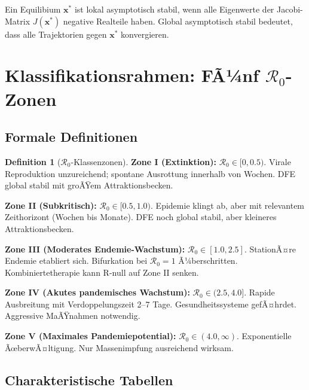 ﻿\documentclass[a4paper,12pt,twoside]{article}
\theoremstyle{definition}
\newtheorem{definition}{Definition}[section]
\begin{document}
Ein Equilibium $\mathbf{x}^*$ ist lokal asymptotisch stabil, wenn alle Eigenwerte der Jacobi-Matrix $J(\mathbf{x}^*)$ negative Realteile haben. Global asymptotisch stabil bedeutet, dass alle Trajektorien gegen $\mathbf{x}^*$ konvergieren.

\section{Klassifikationsrahmen: FÃ¼nf $\mathcal{R}_0$-Zonen}
\label{sec:classification}

\subsection{Formale Definitionen}

\begin{definition}[$\mathcal{R}_0$-Klassenzonen]

\textbf{Zone I (Extinktion):} $\mathcal{R}_0 \in [0, 0.5)$. Virale Reproduktion unzureichend; spontane Ausrottung innerhalb von Wochen. DFE global stabil mit groÃŸem Attraktionsbecken.

\textbf{Zone II (Subkritisch):} $\mathcal{R}_0 \in [0.5, 1.0)$. Epidemie klingt ab, aber mit relevantem Zeithorizont (Wochen bis Monate). DFE noch global stabil, aber kleineres Attraktionsbecken.

\textbf{Zone III (Moderates Endemie-Wachstum):} $\mathcal{R}_0 \in [1.0, 2.5]$. StationÃ¤re Endemie etabliert sich. Bifurkation bei $\mathcal{R}_0 = 1$ Ã¼berschritten. Kombiniertetherapie kann R-null auf Zone II senken.

\textbf{Zone IV (Akutes pandemisches Wachstum):} $\mathcal{R}_0 \in (2.5, 4.0]$. Rapide Ausbreitung mit Verdoppelungszeit 2--7 Tage. Gesundheitssysteme gefÃ¤hrdet. Aggressive MaÃŸnahmen notwendig.

\textbf{Zone V (Maximales Pandemiepotential):} $\mathcal{R}_0 \in (4.0, \infty)$. Exponentielle ÃœberwÃ¤ltigung. Nur Massenimpfung ausreichend wirksam.

\end{definition}

\subsection{Charakteristische Tabellen}
\end{document}

